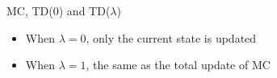 \begin{frame}[c]{MC, TD(0) and TD($\lambda$)}
	
	
	\begin{itemize}
		\item When $\lambda = 0$, only the current state is updated
		\item When $\lambda = 1$, the same as the total update of MC
	\end{itemize}
	
\end{frame}


